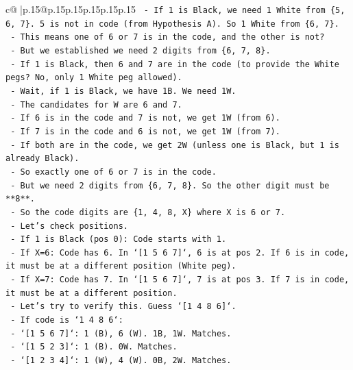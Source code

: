 \documentclass{article}
\begin{document}
{\begin{supertabular}{c@{$\;$}|p{.15\linewidth}@{}p{.15\linewidth}p{.15\linewidth}p{.15\linewidth}p{.15\linewidth}p{.15\linewidth}}
{{{\texttt{    {-}   If 1 is Black, we need 1 White from \{5, 6, 7\}. 5 is not in code (from Hypothesis A). So 1 White from \{6, 7\}.} \\
\texttt{    {-}   This means one of 6 or 7 is in the code, and the other is not?} \\
\texttt{    {-}   But we established we need 2 digits from \{6, 7, 8\}.} \\
\texttt{    {-}   If 1 is Black, then 6 and 7 are in the code (to provide the White pegs? No, only 1 White peg allowed).} \\
\texttt{    {-}   Wait, if 1 is Black, we have 1B. We need 1W.} \\
\texttt{    {-}   The candidates for W are 6 and 7.} \\
\texttt{    {-}   If 6 is in the code and 7 is not, we get 1W (from 6).} \\
\texttt{    {-}   If 7 is in the code and 6 is not, we get 1W (from 7).} \\
\texttt{    {-}   If both are in the code, we get 2W (unless one is Black, but 1 is already Black).} \\
\texttt{    {-}   So exactly one of 6 or 7 is in the code.} \\
\texttt{    {-}   But we need 2 digits from \{6, 7, 8\}. So the other digit must be **8**.} \\
\texttt{    {-}   So the code digits are \{1, 4, 8, X\} where X is 6 or 7.} \\
\texttt{    {-}   Let's check positions.} \\
\texttt{    {-}   If 1 is Black (pos 0): Code starts with 1.} \\
\texttt{    {-}   If X=6: Code has 6. In `{[}1 5 6 7{]}`, 6 is at pos 2. If 6 is in code, it must be at a different position (White peg).} \\
\texttt{    {-}   If X=7: Code has 7. In `{[}1 5 6 7{]}`, 7 is at pos 3. If 7 is in code, it must be at a different position.} \\
\texttt{    {-}   Let's try to verify this. Guess `{[}1 4 8 6{]}`.} \\
\texttt{        {-}   If code is `1 4 8 6`:} \\
\texttt{            {-}   `{[}1 5 6 7{]}`: 1 (B), 6 (W). 1B, 1W. Matches.} \\
\texttt{            {-}   `{[}1 5 2 3{]}`: 1 (B). 0W. Matches.} \\
\texttt{            {-}   `{[}1 2 3 4{]}`: 1 (W), 4 (W). 0B, 2W. Matches.} \\
}}}
\end{supertabular}}
\end{document}

